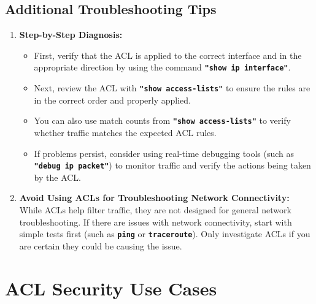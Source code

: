 \documentclass[11pt,a4paper]{article}
\begin{document}
    \subsection*{Additional Troubleshooting Tips}
        \begin{enumerate}
            \item \textbf{Step-by-Step Diagnosis:}
                \begin{itemize}
                    \item First, verify that the ACL is applied to the correct interface and in the appropriate direction by using the command \textbf{\lstinline{"show ip interface"}}.
                    \item Next, review the ACL with \textbf{\lstinline{"show access-lists"}} to ensure the rules are in the correct order and properly applied.
                    \item You can also use match counts from \textbf{\lstinline{"show access-lists"}} to verify whether traffic matches the expected ACL rules.
                    \item If problems persist, consider using real-time debugging tools (such as \textbf{\lstinline{"debug ip packet"}}) to monitor traffic and verify the actions being taken by the ACL.

                \end{itemize}
            \item \textbf{Avoid Using ACLs for Troubleshooting Network Connectivity:} While ACLs help filter traffic, they are not designed for general network troubleshooting. If there are issues with network connectivity, start with simple tests first (such as \textbf{\lstinline{ping}} or \textbf{\lstinline{traceroute}}). Only investigate ACLs if you are certain they could be causing the issue.
        \end{enumerate}

\section*{ACL Security Use Cases}
\end{document}

